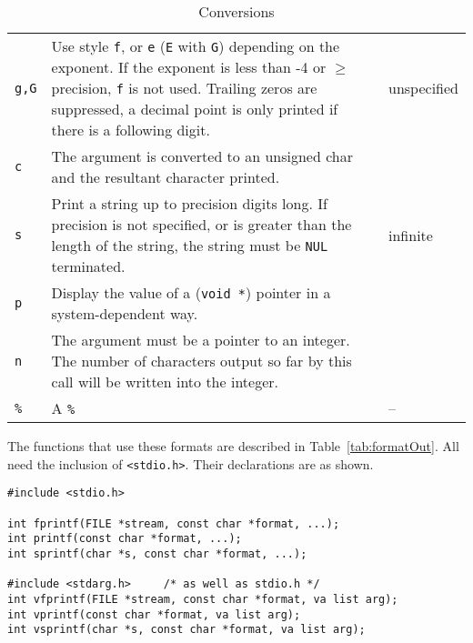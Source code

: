 \begin{table}[htb]
\begin{tabular}{lp{}p{}}
        \texttt{g,G} & Use style \texttt{f}, or \texttt{e} (\texttt{E} with
                       \texttt{G}) depending on the exponent.  If the exponent is less
                       than -4 or $\geq$ precision, \texttt{f} is not
                       used.  Trailing zeros are suppressed, a decimal point is only
                       printed if there is a following digit. & un\-specified  \\

        \texttt{c} & The \kint{} argument is converted
                     to an unsigned char and the
                     resultant character printed. &     \\

        \texttt{s} & Print a string up to precision digits long. If
                     precision is not specified, or is greater than the
                     length of the string, the string must be \texttt{NUL}
                     terminated. & infinite    \\

        \texttt{p} & Display the value of a (\texttt{void *}) pointer in a
                     system-dependent way. &     \\

        \texttt{n} & The argument must be a pointer to an integer.  The number of
                     characters output so far by this call will be written into
                     the integer. &     \\

        \texttt{\%} & A \texttt{\%} & --        \\
    \bottomrule
\end{tabular}
  \caption{\label{tab:conv}Conversions}
\end{table}



   The functions that use these formats are described in
    Table~\ref{tab:formatOut}.  All need the inclusion of
    \texttt{<stdio.h>}.  Their declarations are as shown.


   \begin{Verbatim}
#include <stdio.h>

int fprintf(FILE *stream, const char *format, ...);
int printf(const char *format, ...);
int sprintf(char *s, const char *format, ...);

#include <stdarg.h>     /* as well as stdio.h */
int vfprintf(FILE *stream, const char *format, va list arg);
int vprintf(const char *format, va list arg);
int vsprintf(char *s, const char *format, va list arg);
\end{Verbatim}


